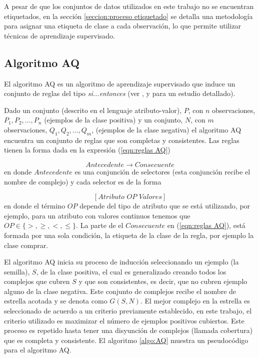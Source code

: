 \documentclass[12pt]{report}
\theoremstyle{break}
\theoremstyle{break}
\begin{document}
A pesar de que los conjuntos de datos utilizados en este trabajo no se encuentran etiquetados, en la sección \ref{seccion:proceso etiquetado} se detalla una metodología para asignar una etiqueta de clase a cada observación, lo que permite utilizar técnicas de aprendizaje supervisado.


\subsection{Algoritmo AQ}
\label{subseccion:algoritmo aq}
El algoritmo AQ es un algoritmo de aprendizaje supervisado que induce un conjunto de reglas del tipo \textit{si...entonces} (ver \cite{AQCervone2010}, \cite{AQMichalski1991} y \cite{AQWojtusiak2012} para un estudio detallado). 

Dado un conjunto (descrito en el lenguaje atributo-valor), $P$, con $n$ observaciones, $P_1, P_2, \ldots, P_n$ (ejemplos de la clase positiva)  y un conjunto, $N$, con $m$ observaciones, $Q_1, Q_2, \ldots, Q_m$, (ejemplos de la clase negativa) el algoritmo AQ encuentra un conjunto de reglas que son completas y consistentes.
Las reglas tienen la forma dada en la expresión (\ref{eqn:reglas AQ})

\begin{equation} \label{eqn:reglas AQ}
Antecedente \rightarrow Consecuente
\end{equation}
en donde $Antecedente$ es una conjunción de selectores (esta conjunción recibe el nombre de complejo) y cada selector es de la forma

\begin{equation} \label{eqn:condicion AQ}
\left[Atributo\,\, OP\,\, Valores \right]
\end{equation}
en donde el término $OP$ depende del tipo de atributo que se está utilizando, por ejemplo, para un atributo con valores continuos tenemos que $OP \in \{>, \geq, <, \leq\}$.
La parte de el $Consecuente$ en (\ref{eqn:reglas AQ}), está formada por una sola condición, la etiqueta de la clase de la regla, por ejemplo la clase comprar.

El algoritmo AQ inicia su proceso de inducción seleccionando un ejemplo (la semilla), $S$, de la clase positiva, el cual es generalizado creando todos los complejos que cubren $S$ y que son consistentes, es decir, que no cubren ejemplo alguno de la clase negativa. Este conjunto de complejos recibe el nombre de estrella acotada y se denota como $G(S,N)$. El mejor complejo en la estrella es seleccionado de acuerdo a un criterio previamente establecido, en este trabajo, el criterio utilizado es maximizar el número de ejemplos positivos cubiertos. Este proceso es repetido hasta tener una disyunción de complejos (llamada cobertura) que es completa y consistente. El algoritmo \ref{algo:AQ} muestra un pseudocódigo para el algoritmo AQ.
\end{document}
